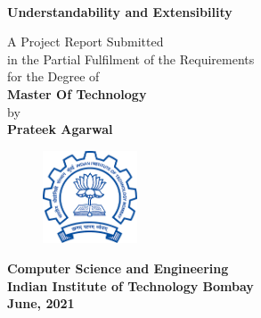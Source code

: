 \titlepage
\begin{center}

\\
 {\bf{\Large{Understandability and Extensibility}}}\\
\end{center}
\vspace{25mm}
\begin{center}
A Project Report Submitted\\
in the Partial Fulfilment of the Requirements
\\
for the Degree of
\\
\vspace{30mm}
{\bf {\large Master Of Technology}}
\\
by
\\
{\bf{\Large Prateek Agarwal}}\\
\end{center}
\vspace{20mm}
\begin{figure}[h]
\centering
\includegraphics[width=0.25\textwidth]{./fig/iitblogo.png}

\end{figure}
\begin{center}
\vspace{3mm}
{\bf {\large {Computer Science and Engineering}}}\\
\vspace{2mm}
{\bf {\large {Indian Institute of Technology Bombay}}}\\
\vspace{3mm}
{\textbf{ June, 2021}}\\
\end{center}
